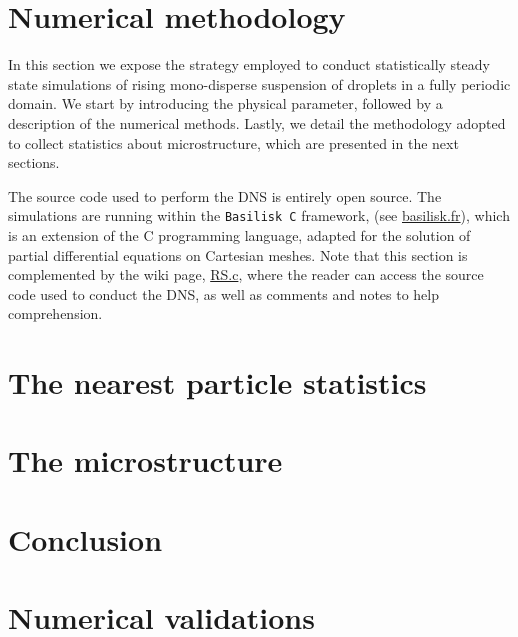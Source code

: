 \documentclass[11pt]{My_preprint}
\begin{document}


\section{Numerical methodology}
\label{sec:methodo}

In this section we expose the strategy employed to conduct statistically steady state simulations of rising mono-disperse suspension of droplets in a fully periodic domain. 
We start by introducing the physical parameter, followed by a description of the numerical methods.
Lastly, we detail the methodology adopted to collect statistics about microstructure, which are presented in the next sections.

The source code used to perform the DNS is entirely open source.
The simulations are running within the \texttt{Basilisk C} framework, (see \href{http://basilisk.fr}{basilisk.fr}), which is an extension of the C programming language, adapted for the solution of partial differential equations on Cartesian meshes. 
Note that this section is complemented by the wiki page, \href{http://basilisk.fr/sandbox/fintzin/Rising-Suspenion/RS.c}{RS.c}, where the reader can access the source code used to conduct the DNS, as well as comments and notes to help comprehension. 








\section{The nearest particle statistics}




\section{The microstructure}
\label{sec:microstructure}




\section{Conclusion}


\appendix
\section{Numerical validations}
\label{ap:validation}

% 




\end{document}
